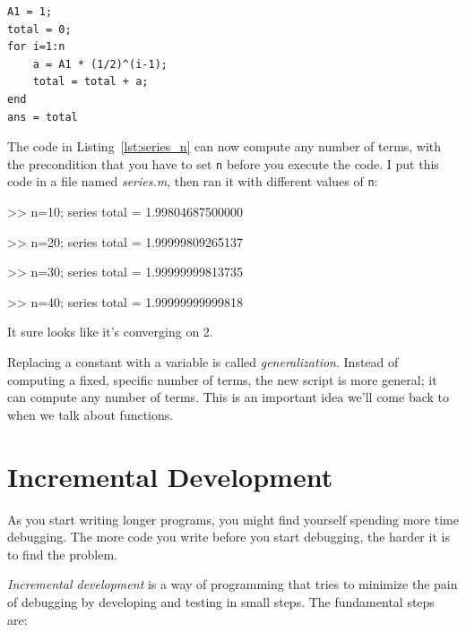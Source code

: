 \begin{lstlisting}[caption={Updating our code from Listing~\ref{lst:series_10} to have a variable number of terms}, label={lst:series_n}]
A1 = 1;
total = 0;
for i=1:n
    a = A1 * (1/2)^(i-1);
    total = total + a;
end
ans = total
\end{lstlisting}

The code in Listing~\ref{lst:series_n} can now compute any number of terms, with the
precondition that you have to set \lstinline{n} before you execute
the code.
I put this code in a file named \emph{series.m}, then
ran it with different values of \lstinline{n}:

\begin{code}
>> n=10; series
total = 1.99804687500000

>> n=20; series
total = 1.99999809265137

>> n=30; series
total = 1.99999999813735

>> n=40; series
total = 1.99999999999818
\end{code}

It sure looks like it's converging on 2.

Replacing a constant with a variable is called \emph{generalization}.
Instead of computing a fixed, specific number of terms, the new script
is more general; it can compute any number of terms.
This is an important idea we'll come back to when we talk about functions.

\section{Incremental Development}


As you start writing longer programs, you might find yourself spending more time debugging.
The more code you write before you start debugging, the harder it is to find
the problem.

\emph{Incremental development} is a way of programming that tries
to minimize the pain of debugging by developing and testing in small steps.  The fundamental steps are:

